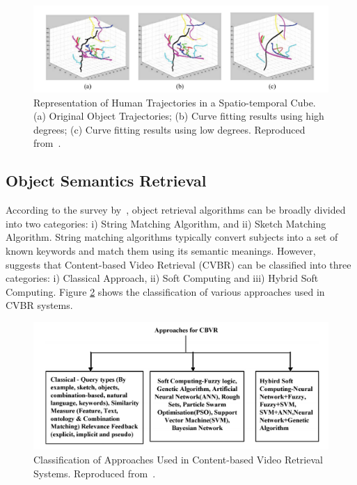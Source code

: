 \begin{figure}[hbt!]
  \centering
  \includegraphics[width=1\textwidth]{image/lit/spatiotemporal2.PNG}
  \caption[Representation of Human Trajectories in a Spatio-temporal Cube. (a)
  Original Object Trajectories; (b) Curve fitting results using high degrees;
  (c) Curve fitting results using low degrees] {Representation of Human
  Trajectories in a Spatio-temporal Cube. (a) Original Object Trajectories; (b)
  Curve fitting results using high degrees; (c) Curve fitting results using low
  degrees. Reproduced from~.}
  \label{fig:spatiocube2}
\end{figure}



\vspace{1em}
\subsection{Object Semantics Retrieval}

According to the survey by~\cite{chandran2017review}, object retrieval
algorithms can be broadly divided into two categories: i) String Matching
Algorithm, and ii) Sketch Matching Algorithm. String matching algorithms
typically convert subjects into a set of known keywords and match them using
its semantic meanings. However,~ suggests that
Content-based Video Retrieval (CVBR) can be classified into three categories: i)
Classical Approach, ii) Soft Computing and iii) Hybrid Soft Computing. Figure
\ref{fig:cvbr} shows the classification of various approaches used in CVBR
systems.

\begin{figure}[hbt!]
  \centering
  \includegraphics[width=.9\textwidth]{image/lit/cvbr.PNG}
  \caption[Classification of Approaches Used in Content-based Video Retrieval
  Systems] {Classification of Approaches Used in Content-based Video Retrieval
  Systems. Reproduced from~.}
  \label{fig:cvbr}
\end{figure}


